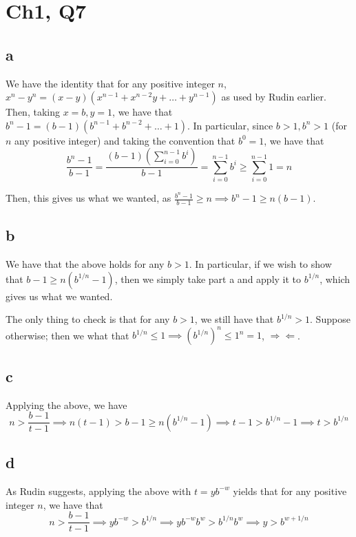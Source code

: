 \documentclass[12pt,letterpaper]{article}
\theoremstyle{definition}
\newcommand{\contra}{\Rightarrow\!\Leftarrow}
\begin{document}
\section*{Ch1, Q7}

\subsection*{a}

We have the identity that for any positive integer $n$, $x^n - y^n =
(x-y)(x^{n-1} + x^{n-2}y + \dots + y^{n-1})$ as used by Rudin earlier. Then,
taking $x = b, y = 1$, we have that $b^n - 1 = (b-1)(b^{n-1} + b^{n-2} + \dots +
1)$. In particular, since $b > 1, b^n > 1$ (for $n$ any positive
integer) and taking the convention
that $b^0 = 1$, we have that
\[
  \frac{b^n - 1}{b-1} = \frac{(b-1)\left(\sum_{i=0}^{n-1}b^i\right)}{b-1} =
  \sum_{i=0}^{n-1}b^i \geq \sum_{i=0}^{n-1} 1 = n
\]

Then, this gives us what we wanted, as $\frac{b^n - 1}{b-1} \geq n \implies b^n
- 1 \geq n(b-1)$.

\subsection*{b}

We have that the above holds for any $b > 1$. In particular, if we wish to show
that $b - 1 \geq n(b^{1 / n} - 1)$, then we simply take part a and apply it to
$b^{1 / n}$, which gives us what we wanted.

The only thing to check is that for any $b > 1$, we still have that $b^{1 / n} >
1$. Suppose otherwise; then we what that $b^{1 / n} \leq 1 \implies (b^{1 /
n})^n \leq 1^n = 1$, $\contra$.

\subsection*{c}

Applying the above, we have
\[
  n > \frac{b-1}{t-1} \implies n(t-1) > b - 1 \geq n(b^{1 / n} - 1) \implies t -
  1 > b^{1 / n} - 1 \implies t > b^{1 / n}
\]

\subsection*{d}

As Rudin suggests, applying the above with $t = yb^{-w}$ yields that for any
positive integer $n$, we have that
\[
  n > \frac{b-1}{t-1} \implies yb^{-w} > b^{1 / n} \implies yb^{-w}b^w > b^{1 /
  n}b^w \implies y > b^{w + 1 / n}
\]
\end{document}

